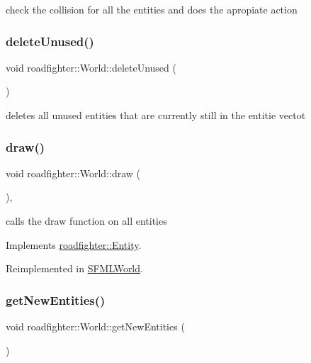 check the collision for all the entities and does the apropiate action \mbox{\label{classroadfighter_1_1World_af7b77b0be8fee9e26093e2990f3889aa}} 
\subsubsection{\texorpdfstring{delete\+Unused()}{deleteUnused()}}
{\footnotesize\ttfamily void roadfighter\+::\+World\+::delete\+Unused (\begin{DoxyParamCaption}{ }\end{DoxyParamCaption})}

deletes all unused entities that are currently still in the entitie vectot \mbox{\label{classroadfighter_1_1World_a90534263a154d6d7c1e8aef4e0138881}} 
\subsubsection{\texorpdfstring{draw()}{draw()}}
{\footnotesize\ttfamily void roadfighter\+::\+World\+::draw (\begin{DoxyParamCaption}{ }\end{DoxyParamCaption})\hspace{0.3cm}{\ttfamily [override]}, {\ttfamily [virtual]}}

calls the draw function on all entities 

Implements \hyperlink{classroadfighter_1_1Entity_ac516f8005f969ad5a86c252e5a3640ee}{roadfighter\+::\+Entity}.



Reimplemented in \hyperlink{classSFMLWorld_aa0e1deda989ca494937054c5f5b139b0}{S\+F\+M\+L\+World}.

\mbox{\label{classroadfighter_1_1World_a8d20efd557fc36fdf6218c0fdedd0b5a}} 
\subsubsection{\texorpdfstring{get\+New\+Entities()}{getNewEntities()}}
{\footnotesize\ttfamily void roadfighter\+::\+World\+::get\+New\+Entities (\begin{DoxyParamCaption}{ }\end{DoxyParamCaption})}

